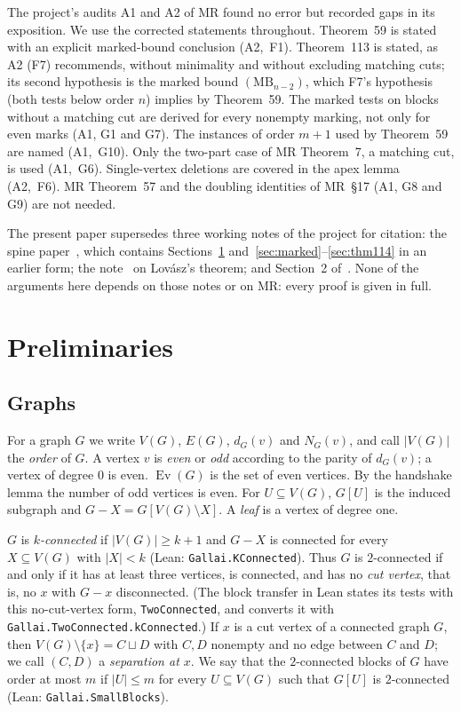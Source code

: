 \documentclass[11pt]{amsart}
\theoremstyle{definition}
\theoremstyle{remark}
\renewcommand{\_}{\oldunderscore\allowbreak}
\newcommand{\lean}[1]{\textup{(Lean: {\small\texttt{#1}})}}
\newcommand{\MBU}{\mathrm{MB}}
\newcommand{\Ev}{\operatorname{Ev}}
\begin{document}
The project's audits A1 and A2 of MR found no error but recorded gaps in its exposition. We use the
corrected statements throughout. Theorem~59 is stated with an explicit marked-bound conclusion (A2,~F1).
Theorem~113 is stated, as A2 (F7) recommends, without minimality and without excluding matching
cuts; its second hypothesis is the marked bound $(\MBU_{n-2})$, which F7's hypothesis (both tests
below order $n$) implies by Theorem~59. The marked tests on blocks
without a matching cut are derived for every nonempty marking, not only for even marks (A1, G1 and
G7). The instances of order $m+1$ used by Theorem~59 are named (A1,~G10). Only the two-part case of
MR Theorem~7, a matching cut, is used (A1,~G6). Single-vertex deletions are covered in the apex lemma
(A2,~F6). MR Theorem~57 and the doubling identities of MR~\S17 (A1, G8 and G9) are not needed.

The present paper supersedes three working notes of the project for citation: the spine
paper~\cite{SP}, which contains Sections~\ref{sec:prelim} and~\ref{sec:marked}--\ref{sec:thm114}
in an earlier form; the note~\cite{LF} on Lov\'asz's theorem; and Section~2 of~\cite{EC}. None of
the arguments here depends on those notes or on MR: every proof is given in full.

\section{Preliminaries}\label{sec:prelim}

\subsection{Graphs}
For a graph $G$ we write $V(G)$, $E(G)$, $d_G(v)$ and $N_G(v)$, and call $|V(G)|$ the
\emph{order} of $G$. A vertex $v$ is \emph{even} or \emph{odd} according to the parity of $d_G(v)$;
a vertex of degree $0$ is even. $\Ev(G)$ is the set of even vertices. By the handshake lemma the
number of odd vertices is even. For $U\subseteq V(G)$, $G[U]$ is the induced subgraph and
$G-X=G[V(G)\setminus X]$. A \emph{leaf} is a vertex of degree one.

$G$ is \emph{$k$-connected} if $|V(G)|\ge k+1$ and $G-X$ is connected for every $X\subseteq V(G)$
with $|X|<k$ \lean{Gallai.KConnected}. Thus $G$ is $2$-connected if and only if it has at least three
vertices, is connected, and has no \emph{cut vertex}, that is, no $x$ with $G-x$ disconnected. (The
block transfer in Lean states its tests with this no-cut-vertex form, \texttt{TwoConnected}, and
converts it with \texttt{Gallai.TwoConnected.kConnected}.) If
$x$ is a cut vertex of a connected graph $G$, then $V(G)\setminus\{x\}=C\sqcup D$ with $C,D$
nonempty and no edge between $C$ and $D$; we call $(C,D)$ a \emph{separation at $x$}. We say that
the $2$-connected blocks of $G$ have order at most $m$ if $|U|\le m$ for every $U\subseteq V(G)$ such
that $G[U]$ is $2$-connected \lean{Gallai.SmallBlocks}.
\end{document}
